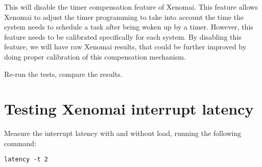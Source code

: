 This will disable the timer compensation feature of Xenomai. This
feature allows Xenomai to adjust the timer programming to take into
account the time the system needs to schedule a task after being woken
up by a timer. However, this feature needs to be calibrated
specifically for each system. By disabling this feature, we will have
raw Xenomai results, that could be further improved by doing proper
calibration of this compensation mechanism.

Re-run the tests, compare the results.

\section{Testing Xenomai interrupt latency}

Measure the interrupt latency with and without load, running the
following command:

\begin{verbatim}
latency -t 2
\end{verbatim}
